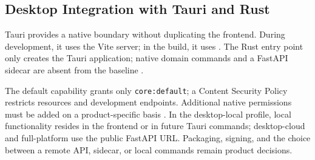 \subsection{Desktop Integration with Tauri and Rust}
\label{subsec:tauri-rust-desktop}

Tauri provides a native boundary without duplicating the frontend. During
development, it uses the Vite server; in the build, it uses
. The Rust entry point only creates the Tauri application;
native domain commands and a FastAPI sidecar are absent from the baseline
\parencite{tauri2026start,rust2026book,kleiveist2026architecture}.

The default capability grants only \texttt{core:default}; a Content Security
Policy restricts resources and development endpoints. Additional native
permissions must be added on a product-specific basis
\parencite{tauri2026capabilities}. In the desktop-local profile, local
functionality resides in the frontend or in future Tauri commands; desktop-cloud
and full-platform use the public FastAPI URL. Packaging, signing, and the choice between a remote
API, sidecar, or local commands remain product decisions.
